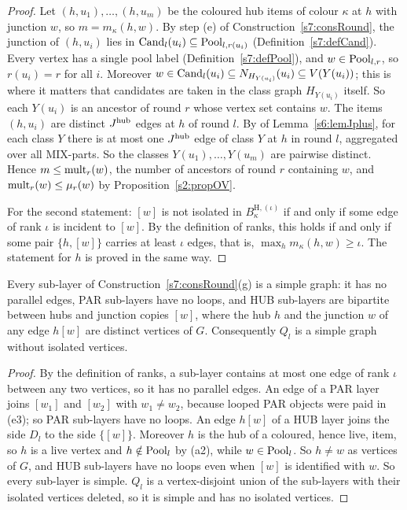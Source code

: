 \begin{proof}
Let $(h,u_1),\dots,(h,u_m)$ be the coloured hub items of colour $\kappa$ at $h$
with junction $w$, so $m=m_\kappa(h,w)$. By step (e) of
Construction~\ref{s7:consRound}, the junction of $(h,u_i)$ lies in
$\mathrm{Cand}_l(u_i)\subseteq\mathrm{Pool}_{l,r(u_i)}$ (Definition~\ref{s7:defCand}). Every
vertex has a single pool label (Definition~\ref{s7:defPool}), and
$w\in\mathrm{Pool}_{l,r}$, so $r(u_i)=r$ for all $i$. Moreover
$w\in\mathrm{Cand}_l(u_i)\subseteq N_{H_{Y(u_i)}}(u_i)\subseteq V(Y(u_i))$; this is where
it matters that candidates are taken in the class graph $H_{Y(u_i)}$ itself. So
each $Y(u_i)$ is an ancestor of round $r$ whose vertex set contains $w$. The
items $(h,u_i)$ are distinct $J^{\mathrm{hub}}$ edges at $h$ of round $l$. By  of
Lemma~\ref{s6:lemJplus}, for each class $Y$ there is at most one $J^{\mathrm{hub}}$ edge of
class $Y$ at $h$ in round $l$, aggregated over all MIX-parts. So the classes
$Y(u_1),\dots,Y(u_m)$ are pairwise distinct. Hence $m\le\mathrm{mult}_r(w)$, the number
of ancestors of round $r$ containing $w$, and $\mathrm{mult}_r(w)\le\mu_r(w)$ by
Proposition~\ref{s2:propOV}.

For the second statement: $[w]$ is not isolated in $B^{\mathrm{H},(\iota)}_\kappa$
if and only if some edge of rank $\iota$ is incident to $[w]$. By the definition
of ranks, this holds if and only if some pair $\{h,[w]\}$ carries at least
$\iota$ edges, that is, $\max_h m_\kappa(h,w)\ge\iota$. The statement for $h$ is
proved in the same way.
\end{proof}

\begin{lemma}[$Q_l$ is simple]\label{s7:lemSimple}
Every sub-layer of Construction~\ref{s7:consRound}(g) is a simple graph: it has
no parallel edges, PAR sub-layers have no loops, and HUB sub-layers are
bipartite between hubs and junction copies $[w]$, where the hub $h$ and the
junction $w$ of any edge $h[w]$ are distinct vertices of $G$. Consequently $Q_l$
is a simple graph without isolated vertices.
\deps{\ref{s7:consRound}}
\end{lemma}

\begin{proof}
By the definition of ranks, a sub-layer contains at most one edge of rank
$\iota$ between any two vertices, so it has no parallel edges. An edge of a PAR
layer joins $[w_1]$ and $[w_2]$ with $w_1\ne w_2$, because looped PAR objects
were paid in (e3); so PAR sub-layers have no loops. An edge $h[w]$ of a HUB
layer joins the side $D_l$ to the side $\{[w]\}$. Moreover $h$ is the hub of a
coloured, hence live, item, so $h$ is a live vertex and $h\notin\mathrm{Pool}_l$ by (a2),
while $w\in\mathrm{Pool}_l$. So $h\ne w$ as vertices of $G$, and HUB sub-layers have no
loops even when $[w]$ is identified with $w$. So every sub-layer is simple.
$Q_l$ is a vertex-disjoint union of the sub-layers with their isolated vertices
deleted, so it is simple and has no isolated vertices.
\end{proof}

